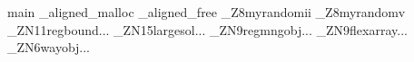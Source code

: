 main
_aligned_malloc
_aligned_free
_Z8myrandomii
_Z8myrandomv
_ZN11regbound...
_ZN15largesol...
_ZN9regmngobj...
_ZN9flexarray...
_ZN6wayobj...
